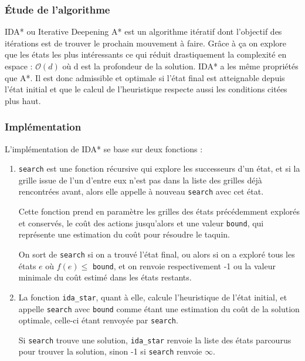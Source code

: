 \documentclass[a4paper, 12pt]{article}
\begin{document}
\subsubsection{Étude de l'algorithme}

IDA* ou Iterative Deepening A* est un algorithme itératif dont l'objectif des itérations est de trouver le prochain mouvement à faire.
Grâce à ça on explore que les états les plus intéressants ce qui réduit drastiquement la complexité en espace : $\mathcal{O}(d)$ où d est la profondeur de la solution.
IDA* a les même propriétés que A*. Il est donc admissible et optimale si l'état final est atteignable depuis l'état initial et que le calcul de l'heuristique respecte aussi les conditions citées plus haut.

\subsubsection{Implémentation}

L'implémentation de IDA* se base sur deux fonctions :
\begin{enumerate}
    \item \lstinline{search} est une fonction récursive qui explore les successeurs d'un état, et si la grille issue de l'un d'entre eux n'est pas dans la liste des grilles déjà rencontrées avant, alors elle appelle à nouveau \lstinline{search} avec cet état.

          Cette fonction prend en paramètre les grilles des états précédemment explorés et conservés, le coût des actions jusqu'alors et une valeur \lstinline{bound}, qui représente une estimation du coût pour résoudre le taquin.

          On sort de \lstinline{search} si on a trouvé l'état final, ou alors si on a exploré tous les états $e$ où $f(e) \leq $ \lstinline{bound}, et on renvoie respectivement -1 ou la valeur minimale du coût estimé dans les états restants.

    \item La fonction \lstinline{ida_star}, quant à elle, calcule l'heuristique de l'état initial, et appelle \lstinline{search} avec \lstinline{bound} comme étant une estimation du coût de la solution optimale, celle-ci étant renvoyée par \lstinline{search}.

          Si \lstinline{search} trouve une solution, \lstinline{ida_star} renvoie la liste des états parcourus pour trouver la solution, sinon -1 si \lstinline{search} renvoie $\infty$.
\end{enumerate}
\end{document}
